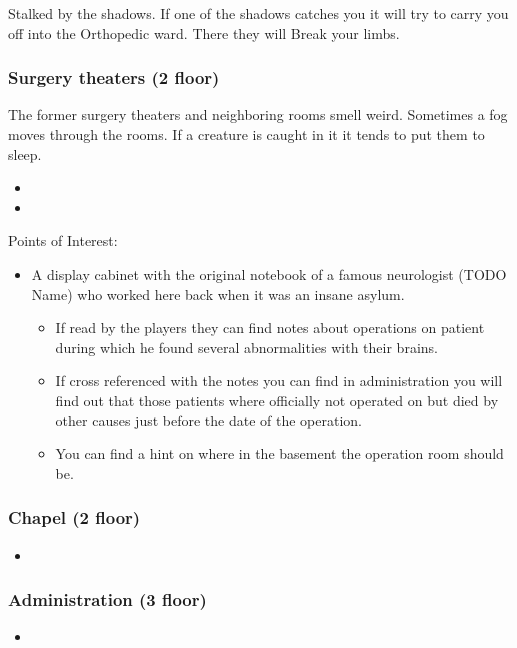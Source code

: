 \documentclass[11pt]{article}
\begin{document}
{Stalked by the shadows. If one of the shadows catches you it will try to carry you off into the Orthopedic ward. There they will Break your limbs.
\subsubsection{Surgery theaters (2 floor)}
\label{sec:orgc9a4835}
The former surgery theaters and neighboring rooms smell weird. Sometimes a fog moves through the rooms. If a creature is caught in it it tends to put them to sleep.

\begin{itemize}
\item {}
\item {}
\end{itemize}

Points of Interest:
\begin{itemize}
\item A display cabinet with the original notebook of a famous neurologist (TODO Name) who worked here back when it was an insane asylum.
\begin{itemize}
\item If read by the players they can find notes about operations on patient during which he found several abnormalities with their brains.
\item If cross referenced with the notes you can find in administration you will find out that those patients where officially not operated on but died by other causes just before the date of the operation.
\item You can find a hint on where in the basement the operation room should be.
\end{itemize}
\end{itemize}
\subsubsection{Chapel (2 floor)}
\label{sec:org7c9478d}

\begin{itemize}
\item {}
\end{itemize}
\subsubsection{Administration (3 floor)}
\label{sec:org5525133}

\begin{itemize}
\item {}
\end{itemize}

}
\end{document}
